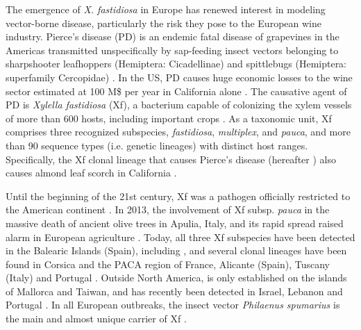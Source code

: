 The emergence of \textit{X. fastidiosa} in Europe has renewed interest in
modeling vector-borne disease, particularly the risk they pose to the European
wine industry. Pierce's disease (PD) is an endemic fatal disease of grapevines
in the Americas transmitted unspecifically by sap-feeding insect vectors
belonging to sharpshooter leafhoppers (Hemiptera: Cicadellinae) and spittlebugs
(Hemiptera: superfamily Cercopidae) \cite{redak2004biology}. In the US, PD
causes huge economic losses to the wine sector estimated at 100 M\$ per year in
California alone \cite{tumber2014pierce}. The causative agent of PD is
\textit{Xylella fastidiosa} (Xf), a bacterium capable of colonizing the xylem
vessels of more than 600 hosts, including important crops
\cite{delbianco2019new}. As a taxonomic unit, Xf comprises three recognized
subspecies, \textit{fastidiosa}, \textit{multiplex}, and \textit{pauca}, and
more than 90 sequence types (i.e. genetic lineages) with distinct host ranges.
Specifically, the Xf clonal lineage that causes Pierce's disease (hereafter
\xf) also causes almond leaf scorch in California \cite{almeida2003biological}.

Until the beginning of the 21st century, Xf was a pathogen officially
restricted to the American continent \cite{almeida2015plant}. In 2013, the
involvement of Xf subsp. \textit{pauca} in the massive death of ancient olive
trees in Apulia, Italy, and its rapid spread raised alarm in European
agriculture \cite{saponari2013identification}. Today, all three Xf subspecies
have been detected in the Balearic Islands (Spain), including \xf{}, and
several clonal lineages have been found in Corsica and the PACA region of
France, Alicante (Spain), Tuscany (Italy) and Portugal
\cite{olmo2021landscape,denance2017several,marco2021evidence}. Outside North
America, \xf{} is only established on the islands of Mallorca and Taiwan, and
has recently been detected in Israel, Lebanon and Portugal
\cite{zecharia2022xylella,carvalho2022dispersion}. In all European outbreaks,
the insect vector \textit{Philaenus spumarius} is the main and almost unique
carrier of Xf \cite{cornara2018philaenus}.

